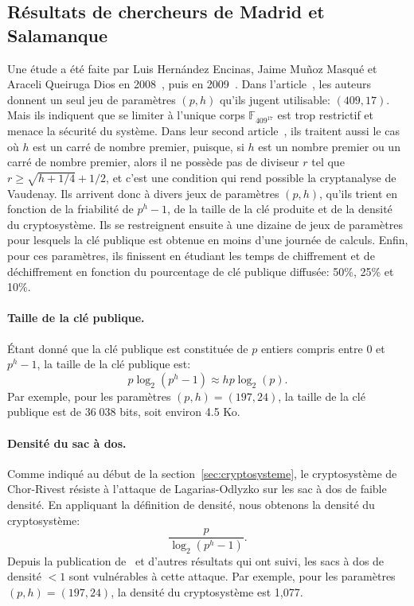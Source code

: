 \documentclass[a4paper, titlepage, 11pt]{article}
\theoremstyle{definition}
\theoremstyle{remark}
\def\gf #1{\mathbb{F}_{#1}}
\begin{document}
\subsection{Résultats de chercheurs de Madrid et Salamanque}
Une étude a été faite par Luis Hern\'andez Encinas, Jaime Mu\~noz Masqué et Araceli Queiruga Dios en 2008~\cite{HEMMQD2008}, puis en 2009~\cite{HEMMQD2009}.
Dans l'article~\cite{HEMMQD2008}, les auteurs donnent un seul jeu de paramètres $(p,h)$ qu'ils jugent utilisable: $(409,17)$. Mais ils indiquent que se limiter à l'unique corps $\gf{409^{17}}$ est trop restrictif et menace la sécurité du système.
Dans leur second article~\cite{HEMMQD2009}, ils traitent aussi le cas où $h$ est un carré de nombre premier, puisque, si $h$ est un nombre premier ou un carré de nombre premier, alors il ne possède pas de diviseur $r$ tel que $r \geqslant \sqrt{h + 1/4} + 1/2$, et c'est une condition qui rend possible la cryptanalyse de Vaudenay. Ils arrivent donc à divers jeux de paramètres $(p,h)$, qu'ils trient en fonction de la friabilité de $p^h-1$, de la taille de la clé produite et de la densité du cryptosystème. Ils se restreignent ensuite à une dizaine de jeux de paramètres pour lesquels la clé publique est obtenue en moins d'une journée de calculs. Enfin, pour ces paramètres, ils finissent en étudiant les temps de chiffrement et de déchiffrement en fonction du pourcentage de clé publique diffusée: 50\%, 25\% et 10\%.

\paragraph{Taille de la clé publique.}Étant donné que la clé publique est constituée de $p$ entiers compris entre $0$ et $p^h -1$, la taille de la clé publique est:
$$p \log_2(p^h-1) \approx hp\log_2(p).$$
Par exemple, pour les paramètres $(p,h) = (197, 24)$, la taille de la clé publique est de $36\;038$ bits, soit environ 4.5 Ko.

\paragraph{Densité du sac à dos.}Comme indiqué au début de la section~\ref{sec:cryptosysteme}, le cryptosystème de Chor-Rivest résiste à l'attaque de Lagarias-Odlyzko\cite{lagarias1983} sur les sac à dos de faible densité. En appliquant la définition de densité, nous obtenons la densité du cryptosystème:
$$\frac{p}{\log_2(p^h-1)}.$$
Depuis la publication de~\cite{lagarias1983} et d'autres résultats qui ont suivi, les sacs à dos de densité $< 1$ sont vulnérables à cette attaque.
Par exemple, pour les paramètres $(p,h) = (197, 24)$, la densité du cryptosystème est 1,077.
\end{document}
